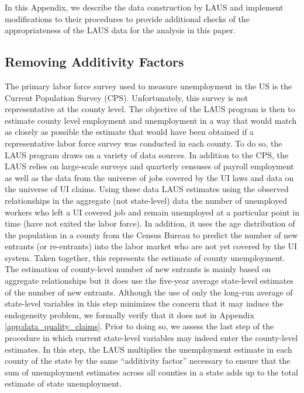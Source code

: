 \documentclass[12pt]{article}
\newcommand{\1}{\mathbf{1}}
\begin{document}
\begin{appendix}
In this Appendix, we describe the data construction by LAUS and implement modifications to their procedures to provide additional checks of the appropriateness of the LAUS data for the analysis in this paper.

\subsection{Removing Additivity Factors}
\label{app:data_quality_additivity}
The primary labor force survey used to measure unemployment in the US is the Current Population Survey (CPS). Unfortunately, this survey is not representative at the county level. The objective of the LAUS program is then to estimate county level employment and unemployment in a way that would match as closely as possible the estimate that would have been obtained if a representative labor force survey was conducted in each county. To do so, the LAUS program draws on a variety of data sources. In addition to the CPS, the LAUS relies on large-scale surveys and quarterly censuses of payroll employment as well as the data from the universe of jobs covered by the UI laws and data on the universe of UI claims. Using these data LAUS estimates using the observed relationships in the aggregate (not state-level) data the number of unemployed workers who left a UI covered job and remain unemployed at a particular point in time (have not exited the labor force). In addition, it uses the age distribution of the population in a county from the Census Bureau to predict the number of new entrants (or re-entrants) into the labor market who are not yet covered by the UI system. Taken together, this represents the estimate of county unemployment. The estimation of county-level number of new entrants is mainly based on aggregate relationships but it does use the five-year average state-level estimates of the number of new entrants. Although the use of only the long-run average of state-level variables in this step minimizes the concern that it may induce the endogeneity problem, we formally verify that it does not in Appendix \ref{app:data_quality_claims}.
Prior to doing so, we assess the last step of the procedure in which current state-level variables may indeed enter the county-level estimates. In this step, the LAUS multiplies the unemployment estimate in each county of the state by the same ``additivity factor'' necessary to ensure that the sum of unemployment estimates across all counties in a state adds up to the total estimate of state unemployment.


\end{appendix}
\end{document}
